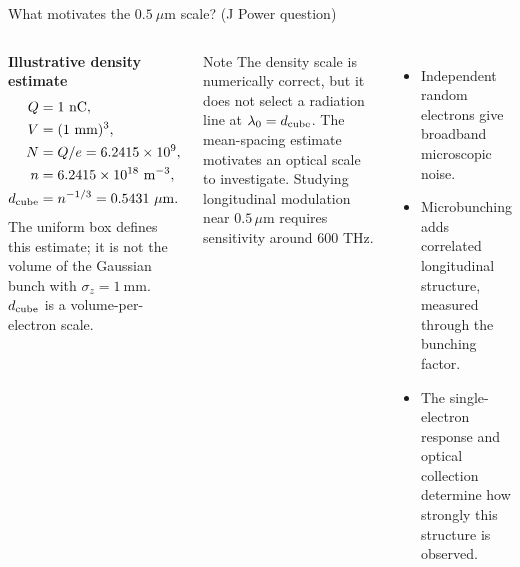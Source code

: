 \documentclass[10pt,aspectratio=169]{beamer}
\begin{document}
\begin{frame}{What motivates the \(0.5\ \mu\mathrm{m}\) scale? (J Power question)}
\begin{columns}[T,onlytextwidth]
\textbf{Illustrative density estimate}
\begin{align*}
 Q &= 1\ \mathrm{nC},\\
 V &= (1\ \mathrm{mm})^3,\\
 N &= Q/e = 6.2415\times 10^{9},\\
 n &= 6.2415\times 10^{18}\ \mathrm{m}^{-3},\\
 d_{\rm cube} &= n^{-1/3}=0.5431\ \mu\mathrm{m}.
\end{align*}
\footnotesize The uniform box defines this estimate;
it is not the volume of the Gaussian bunch with \(\sigma_z=1\ \mathrm{mm}\).
\small \(d_{\rm cube}\) is a volume-per-electron scale.

\begin{block}{Note}
The density scale is numerically correct, but it does \alert{not} select a radiation line at \(\lambda_0=d_{\rm cube}\). The mean-spacing estimate motivates an optical scale to investigate. Studying longitudinal modulation near \(0.5\,\mu\mathrm m\) requires sensitivity around \(600\) THz. 
\end{block}
\begin{itemize}
  \setlength{\itemsep}{0pt}
  \item Independent random electrons give broadband microscopic noise.
  \item Microbunching adds correlated longitudinal structure, measured through the bunching factor.
  \item The single-electron response and optical collection determine how strongly this structure is observed.
\end{itemize}
\end{columns}
\end{frame}
\end{document}
